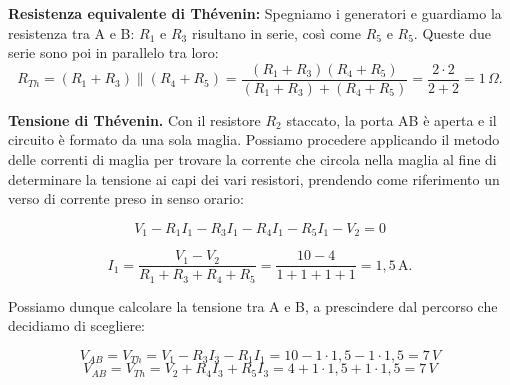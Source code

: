 \begin{esempio}
\begin{center}
\end{center}































\textbf{Resistenza equivalente di Thévenin:} Spegniamo i generatori e guardiamo la resistenza tra A e B: \(R_1\) e \(R_3\) risultano in serie, così come \(R_5\) e \(R_5\). Queste due serie sono poi in parallelo tra loro:
\[
R_{Th} = \left(R_1 + R_3 \right) \parallel \left(R_4 + R_5 \right) = \frac{\left(R_1 + R_3 \right) \left(R_4 + R_5 \right)}{\left(R_1 + R_3 \right) + \left(R_4 + R_5 \right)} = \frac{2 \cdot 2}{2+2} = 1\,\Omega.
\]



\textbf{Tensione di Thévenin.} Con il resistore \(R_2\) staccato, la porta AB è aperta e il circuito è formato da una sola maglia.
Possiamo procedere applicando il metodo delle correnti di maglia per trovare la corrente che circola nella maglia al fine di determinare la tensione ai capi dei vari resistori, prendendo come riferimento un verso di corrente preso in senso orario:

\[
V_1 - R_1 I_1 - R_3 I_1 - R_4 I_1 - R_5 I_1 - V_2 = 0
\]

\[
I_1 = \frac{V_1- V_2}{R_1 + R_3 + R_4 + R_5} = \frac{10-4}{1+1+1+1} = 1,5\,\text{A}.
\]

Possiamo dunque calcolare la tensione tra A e B, a prescindere dal percorso che decidiamo di scegliere:

\[V_{AB} = V_{Th} = V_1 - R_3 I_3 - R_1 I_1 = 10 - 1\cdot 1,5 - 1\cdot 1,5  = 7\, V\]
\[V_{AB} = V_{Th} = V_2 + R_4 I_3 + R_5 I_3 = 4 + 1 \cdot 1,5 + 1 \cdot 1,5 = 7\, V\]

\end{esempio}

